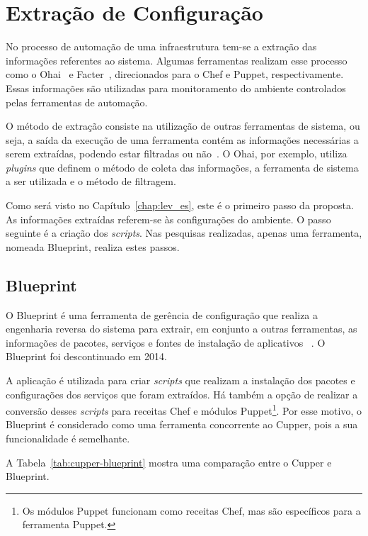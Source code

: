 \section{Extração de Configuração}

No processo de automação de uma infraestrutura tem-se a extração das
informações referentes ao sistema. Algumas ferramentas realizam esse
processo como o Ohai~\cite{ohaidoc:2016} e Facter~\cite{facterdoc:2016},
direcionados para o Chef e Puppet, respectivamente. Essas informações
são utilizadas para monitoramento do ambiente controlados pelas ferramentas
de automação.

O método de extração consiste na utilização de outras ferramentas de sistema,
ou seja, a saída da execução de uma ferramenta contém as informações necessárias
a serem extraídas, podendo estar filtradas ou não~\cite{ohaidoc:2016}. O Ohai,
por exemplo, utiliza \textit{plugins} que definem o método de coleta das informações,
a ferramenta de sistema a ser utilizada e o método de filtragem.

Como será visto no Capítulo~\ref{chap:lev_es}, este é o primeiro passo da proposta.
As informações extraídas referem-se às configurações do ambiente. O passo
seguinte é a criação dos \textit{scripts}. Nas pesquisas realizadas, apenas uma ferramenta,
nomeada Blueprint, realiza estes passos.

\subsection{Blueprint}

O Blueprint é uma ferramenta de gerência de configuração que realiza a
engenharia reversa do sistema para extrair, em conjunto a outras ferramentas,
as informações de pacotes, serviços e fontes de instalação de aplicativos
~\cite{blueprint:2016}. O Blueprint foi descontinuado em 2014.

A aplicação é utilizada para criar \textit{scripts} que realizam
a instalação dos pacotes e configurações dos serviços que foram extraídos. Há
também a opção de realizar a conversão desses \textit{scripts} para receitas Chef e módulos
Puppet\footnote{Os módulos Puppet funcionam como receitas Chef, mas são específicos para a ferramenta Puppet.}.
Por esse motivo, o Blueprint é considerado como uma ferramenta concorrente ao Cupper,
pois a sua funcionalidade é semelhante.

A Tabela~\ref{tab:cupper-blueprint} mostra uma comparação entre o Cupper e Blueprint.

